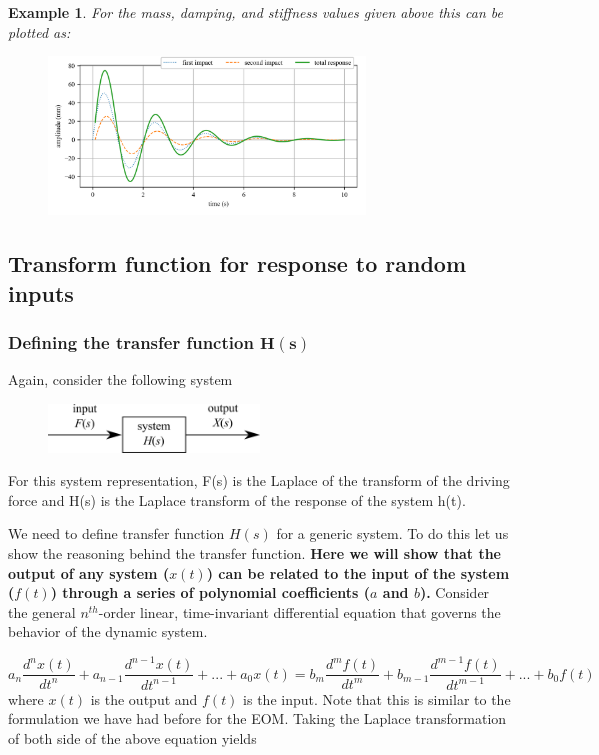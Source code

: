 \documentclass[12pt,letter]{article}
\newtheorem{ex}{Example}
\numberwithin{ex}{section} %
\newenvironment{example}{\begin{mdframed}[middlelinewidth=0.5mm]\begin{ex}\normalfont}{\end{ex}\end{mdframed}}
\numberwithin{re}{section} %
\begin{document}
\begin{example}
For the mass, damping, and stiffness values given above this can be plotted as:
\begin{figure}[H]
	\centering
	\includegraphics[width=0.75\textwidth]{../Figures/response_double_impact.png}
\end{figure}

\end{example}


\subsection{Transform function for response to random inputs}
	
\subsubsection{Defining the transfer function $\mathbf{H(s)}$}

Again, consider the following system
\begin{figure}[H]
	\centering
	\includegraphics[width=0.5\textwidth]{../Figures/system_input_output.png}
\end{figure}
For this system representation, F(s) is the Laplace of the transform of the driving force and H(s) is the Laplace transform of the response of the system h(t). 

We need to define transfer function $H(s)$ for a generic system. To do this let us show the reasoning behind the transfer function. \textbf{Here we will show that the output of any system ($x(t)$) can be related to the input of the system ($f(t)$) through a series of polynomial coefficients ($a$ and $b$).} Consider the general $n^{th}$-order linear, time-invariant differential equation that governs the behavior of the dynamic system.

\begin{equation}
a_n\frac{d^nx(t)}{dt^n} + a_{n-1}\frac{d^{n-1}x(t)}{dt^{n-1}} + ... + a_0x(t) = b_m\frac{d^mf(t)}{dt^m} + b_{m-1}\frac{d^{m-1}f(t)}{dt^{m-1}} + ... + b_0f(t)
\end{equation} 
where $x(t)$ is the output and $f(t)$ is the input. Note that this is similar to the formulation we have had before for the EOM. Taking the Laplace transformation of both side of the above equation yields
\end{document}
